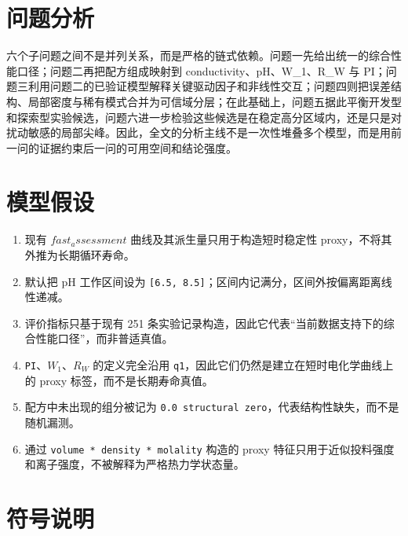 \documentclass[bwprint]{gmcmthesis}
\numberwithin{figure}{section}
\begin{document}
\section{问题分析}

六个子问题之间不是并列关系，而是严格的链式依赖。问题一先给出统一的综合性能口径；问题二再把配方组成映射到 conductivity、pH、W\_1、R\_W 与 PI；问题三利用问题二的已验证模型解释关键驱动因子和非线性交互；问题四则把误差结构、局部密度与稀有模式合并为可信域分层；在此基础上，问题五据此平衡开发型和探索型实验候选，问题六进一步检验这些候选是在稳定高分区域内，还是只是对扰动敏感的局部尖峰。因此，全文的分析主线不是一次性堆叠多个模型，而是用前一问的证据约束后一问的可用空间和结论强度。\par

\section{模型假设}

\begin{enumerate}
\item 现有 $fast_assessment$ 曲线及其派生量只用于构造短时稳定性 proxy，不将其外推为长期循环寿命。
\item 默认把 pH 工作区间设为 \texttt{[6.5, 8.5]}；区间内记满分，区间外按偏离距离线性递减。
\item 评价指标只基于现有 251 条实验记录构造，因此它代表“当前数据支持下的综合性能口径”，而非普适真值。
\item \texttt{PI}、$W_1$、$R_W$ 的定义完全沿用 \texttt{q1}，因此它们仍然是建立在短时电化学曲线上的 proxy 标签，而不是长期寿命真值。
\item 配方中未出现的组分被记为 \texttt{0.0 structural zero}，代表结构性缺失，而不是随机漏测。
\item 通过 \texttt{volume * density * molality} 构造的 proxy 特征只用于近似投料强度和离子强度，不被解释为严格热力学状态量。
\end{enumerate}

\section{符号说明}
\end{document}
